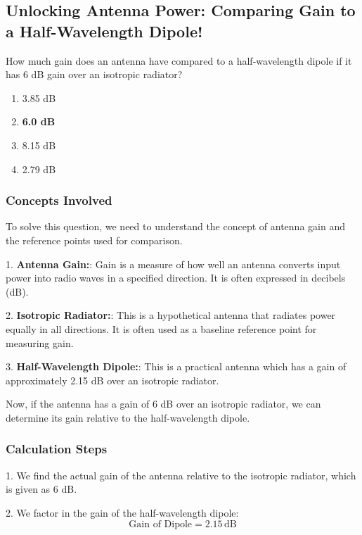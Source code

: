 \subsection{Unlocking Antenna Power: Comparing Gain to a Half-Wavelength Dipole!}

\begin{tcolorbox}[colback=gray!10, colframe=black, title=E9A12] How much gain does an antenna have compared to a half-wavelength dipole if it has 6 dB gain over an isotropic radiator? 

\begin{enumerate}[label=\Alph*.]
    \item 3.85 dB
    \item \textbf{6.0 dB}
    \item 8.15 dB
    \item 2.79 dB
\end{enumerate} \end{tcolorbox}

\subsubsection{Concepts Involved}

To solve this question, we need to understand the concept of antenna gain and the reference points used for comparison. 

1. \textbf{Antenna Gain:}: Gain is a measure of how well an antenna converts input power into radio waves in a specified direction. It is often expressed in decibels (dB).

2. \textbf{Isotropic Radiator:}: This is a hypothetical antenna that radiates power equally in all directions. It is often used as a baseline reference point for measuring gain.

3. \textbf{Half-Wavelength Dipole:}: This is a practical antenna which has a gain of approximately 2.15 dB over an isotropic radiator.

Now, if the antenna has a gain of 6 dB over an isotropic radiator, we can determine its gain relative to the half-wavelength dipole.

\subsubsection{Calculation Steps}

1. We find the actual gain of the antenna relative to the isotropic radiator, which is given as 6 dB.
   
2. We factor in the gain of the half-wavelength dipole:
   \[
   \text{Gain of Dipole} = 2.15 \, \text{dB}
   \]

